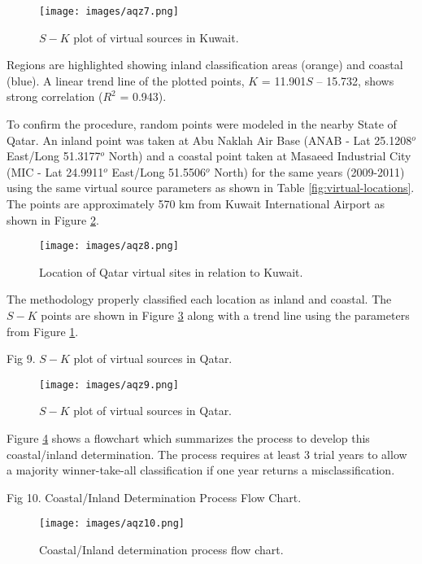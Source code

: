 %
%
\begin{figure}
\texttt{[image: images/aqz7.png]} 
\caption{$S-K$ plot of virtual sources in Kuwait.}
\label{fig:SKplotKuwait}
\end{figure}
%

Regions are highlighted showing inland classification areas (orange) and coastal (blue). A linear trend line of the plotted points, $K$ = 11.901$S$ – 15.732, shows strong correlation ($R^{2}$ = 0.943).

To confirm the procedure, random points were modeled in the nearby State of Qatar. An inland point was taken at Abu Naklah Air Base (ANAB - Lat 25.1208$^{o}$ East/Long 51.3177$^{o}$ North) and a coastal point taken at Masaeed Industrial City (MIC - Lat 24.9911$^{o}$ East/Long 51.5506$^{o}$ North) for the same years (2009-2011) using the same virtual source parameters as shown in Table \ref{fig:virtual-locations}. The points are approximately 570 km from Kuwait International Airport as shown in Figure \ref{fig:qatarlocs}. 

%
\begin{figure}
\texttt{[image: images/aqz8.png]} 
\caption{Location of Qatar virtual sites in relation to Kuwait.}
\label{fig:qatarlocs}
\end{figure}
%

The methodology properly classified each location as inland and coastal.  The $S-K$ points are shown in Figure \ref{fig:SKplotQatar} along with a trend line using the parameters from Figure \ref{fig:SKplotKuwait}.

 
Fig 9. $S-K$ plot of virtual sources in Qatar.
%
\begin{figure}
\texttt{[image: images/aqz9.png]} 
\caption{$S-K$ plot of virtual sources in Qatar.}
\label{fig:SKplotQatar}
\end{figure}
%

Figure \ref{fig:flowchart} shows a flowchart which summarizes the process to develop this coastal/inland determination.  The process requires at least 3 trial years to allow a majority winner-take-all classification if one year returns a misclassification.

Fig 10. Coastal/Inland Determination Process Flow Chart.
%
\begin{figure}
\texttt{[image: images/aqz10.png]} 
\caption{Coastal/Inland determination process flow chart.}
\label{fig:flowchart}
\end{figure}
%

